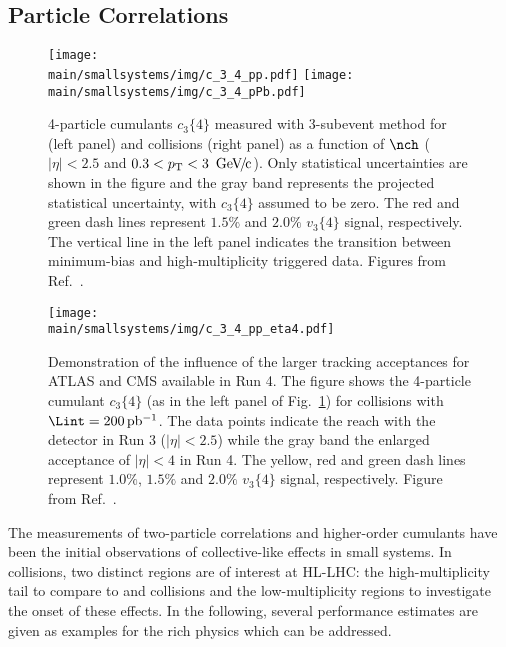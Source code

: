 \documentclass[../report.tex]{subfiles}
\providecommand{\main}{..}
\begin{document}
\subsection{Particle Correlations}
\label{sect:smallsystems_correlations}

\begin{figure}[t]
\centering
\texttt{[image: \\main/smallsystems/img/c\_3\_4\_pp.pdf]}
\hfill
\texttt{[image: \\main/smallsystems/img/c\_3\_4\_pPb.pdf]}
\caption{4-particle cumulants $c_3\{4\}$ measured with 3-subevent method for \pp (left panel) and \pPb collisions (right panel) as a function of $\nch$ ($|\eta| < 2.5$ and $0.3 < \pT < \unit[3]{\UGeVc}$). Only statistical uncertainties are shown in the figure and the gray band represents the projected statistical uncertainty, with $c_3\{4\}$ assumed to be zero. The red and green dash lines represent $1.5\%$ and $2.0\%$ $v_3\{4\}$ signal, respectively. The vertical line in the left panel indicates the transition between minimum-bias and high-multiplicity triggered data. Figures from Ref.~\cite{ATL-PHYS-PUB-2018-020}.}
\label{fig:smallsystems_corr_cumulants}
\end{figure}

\begin{figure}[t]
\centering
\texttt{[image: \\main/smallsystems/img/c\_3\_4\_pp\_eta4.pdf]}
\caption{Demonstration of the influence of the larger tracking acceptances for ATLAS and CMS available in Run 4. The figure shows the 4-particle cumulant $c_3\{4\}$ (as in the left panel of Fig.~\ref{fig:smallsystems_corr_cumulants}) for \pp collisions with $\Lint = \unit[200]{pb^{-1}}$. The data points indicate the reach with the detector in Run 3 ($|\eta| < 2.5$) while the gray band the enlarged acceptance of $|\eta| < 4$ in Run 4. The yellow, red and green dash lines represent $1.0\%$, $1.5\%$ and $2.0\%$ $v_3\{4\}$ signal, respectively. Figure from Ref.~\cite{ATL-PHYS-PUB-2018-020}.}
\label{fig:smallsystems_corr_cumulants_eta4}
\end{figure}

The measurements of two-particle correlations and higher-order cumulants have been the initial observations of collective-like effects in small systems. In \pp collisions, two distinct regions are of interest at HL-LHC: the high-multiplicity tail to compare to \pPb and \PbPb collisions and the low-multiplicity regions to investigate the onset of these effects. In the following, several performance estimates are given as examples for the rich physics which can be addressed.
\end{document}

